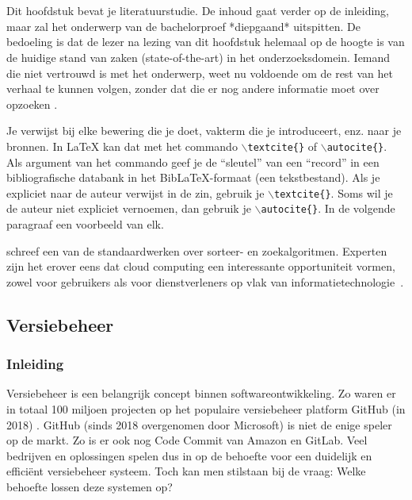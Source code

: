 \chapter{}
\label{ch:stand-van-zaken}
\graphicspath{{../../Images/}} 


Dit hoofdstuk bevat je literatuurstudie. De inhoud gaat verder op de inleiding, maar zal het onderwerp van de bachelorproef *diepgaand* uitspitten. De bedoeling is dat de lezer na lezing van dit hoofdstuk helemaal op de hoogte is van de huidige stand van zaken (state-of-the-art) in het onderzoeksdomein. Iemand die niet vertrouwd is met het onderwerp, weet nu voldoende om de rest van het verhaal te kunnen volgen, zonder dat die er nog andere informatie moet over opzoeken \autocite{Pollefliet2011}.

Je verwijst bij elke bewering die je doet, vakterm die je introduceert, enz. naar je bronnen. In \LaTeX{} kan dat met het commando \texttt{$\backslash${textcite\{\}}} of \texttt{$\backslash${autocite\{\}}}. Als argument van het commando geef je de ``sleutel'' van een ``record'' in een bibliografische databank in het Bib\LaTeX{}-formaat (een tekstbestand). Als je expliciet naar de auteur verwijst in de zin, gebruik je \texttt{$\backslash${}textcite\{\}}.
Soms wil je de auteur niet expliciet vernoemen, dan gebruik je \texttt{$\backslash${}autocite\{\}}. In de volgende paragraaf een voorbeeld van elk.

\textcite{Knuth1998} schreef een van de standaardwerken over sorteer- en zoekalgoritmen. Experten zijn het erover eens dat cloud computing een interessante opportuniteit vormen, zowel voor gebruikers als voor dienstverleners op vlak van informatietechnologie~\autocite{Creeger2009}.
\newpage
\section{Versiebeheer}
\subsection{Inleiding}
\label{sec:vb_inleiding}
Versiebeheer is een belangrijk concept binnen softwareontwikkeling. Zo waren er in totaal 100 miljoen projecten op het populaire versiebeheer platform GitHub (in 2018) \autocite{Git2018}. GitHub (sinds 2018 overgenomen door Microsoft) is niet de enige speler op de markt. Zo is er ook nog Code Commit van Amazon en GitLab. Veel bedrijven en oplossingen spelen dus in op de behoefte voor een duidelijk en efficiënt versiebeheer systeem. Toch kan men stilstaan bij de vraag: Welke behoefte lossen deze systemen op?

